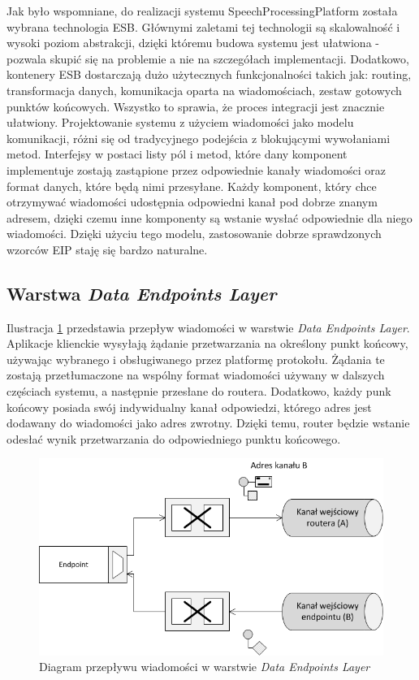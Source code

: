 Jak było wspomniane, do realizacji systemu SpeechProcessingPlatform została wybrana technologia ESB. Głównymi zaletami tej technologii są skalowalność i wysoki poziom abstrakcji, dzięki któremu budowa systemu jest ułatwiona - pozwala skupić się na problemie a nie na szczegółach implementacji. Dodatkowo, kontenery ESB dostarczają dużo użytecznych funkcjonalności takich jak: routing, transformacja danych, komunikacja oparta na wiadomościach, zestaw gotowych punktów końcowych. Wszystko to sprawia, że proces integracji jest znacznie ułatwiony. Projektowanie systemu z użyciem wiadomości jako modelu komunikacji, różni się od tradycyjnego podejścia z blokującymi wywołaniami metod. Interfejsy w postaci listy pól i metod, które dany komponent implementuje zostają zastąpione przez odpowiednie kanały wiadomości oraz format danych, które będą nimi przesyłane. Każdy komponent, który chce otrzymywać wiadomości udostępnia odpowiedni kanał pod dobrze znanym adresem, dzięki czemu inne komponenty są wstanie wysłać odpowiednie dla niego wiadomości. Dzięki użyciu tego modelu, zastosowanie dobrze sprawdzonych wzorców EIP staję się bardzo naturalne. 

\subsection{Warstwa \textit{Data Endpoints Layer}}

Ilustracja \ref{fig:endpoins_layer_project} przedstawia przepływ wiadomości w warstwie \textit{Data Endpoints Layer}. Aplikacje klienckie wysyłają żądanie przetwarzania na określony punkt końcowy, używając wybranego i obsługiwanego przez platformę protokołu. Żądania te zostają przetłumaczone na wspólny format wiadomości używany w dalszych częściach systemu, a następnie przesłane do routera. Dodatkowo, każdy punk końcowy posiada swój indywidualny kanał odpowiedzi, którego adres jest dodawany do wiadomości jako adres zwrotny. Dzięki temu, router będzie wstanie odesłać wynik przetwarzania do odpowiedniego punktu końcowego.

\begin{figure}[!h]
	\centering
	\includegraphics[scale=0.8]{endpoints_layer_flow.png}
	\caption{Diagram przepływu wiadomości w warstwie \textit{Data Endpoints Layer}}\label{fig:endpoins_layer_project}
\end{figure}

